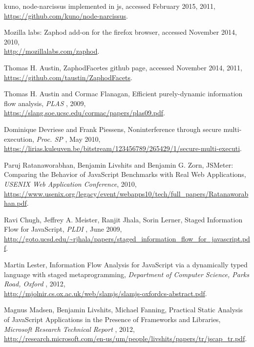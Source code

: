\begin{thebibliography}{10}
 kuno, node-narcissus implemented in js, accessed February 2015, 2011,\\
\url{https://github.com/kuno/node-narcissus}.

 Mozilla labs: Zaphod add-on for the firefox browser, accessed November 2014, 2010, \\
\url{http://mozillalabs.com/zaphod}.

 Thomas H. Austin, ZaphodFacetes github page, accessed November 2014, 2011, \\
\url{https://github.com/taustin/ZaphodFacets}.

 Thomas H. Austin and Cormac Flanagan, Efficient purely-dynamic information
flow analysis, {\it PLAS }, 2009, \\
\url{https://slang.soe.ucsc.edu/cormac/papers/plas09.pdf}.

 Dominique Devriese and Frank Piessens, Noninterference through secure multi-execution, {\it Proc. SP} , May 2010, \\
\url{https://lirias.kuleuven.be/bitstream/123456789/265429/1/secure-multi-executi}.

 Paruj Ratanaworabhan, Benjamin Livshits and Benjamin G. Zorn, JSMeter: Comparing the Behavior of JavaScript Benchmarks with Real Web Applications, {\it USENIX Web Application Conference}, 2010, \\
\url{https://www.usenix.org/legacy/event/webapps10/tech/full_papers/Ratanaworabhan.pdf}.

 Ravi Chugh, Jeffrey A. Meister, Ranjit Jhala, Sorin Lerner, Staged Information Flow for JavaScript, {\it PLDI }, June 2009, \\
\url{http://goto.ucsd.edu/~rjhala/papers/staged_information_flow_for_javascript.pdf}.

 Martin Lester, Information Flow Analysis for JavaScript via a dynamically typed language with staged metaprogramming, { \it Department of Computer Science, Parks Road, Oxford }, 2012,\\
\url{http://mjolnir.cs.ox.ac.uk/web/slamjs/slamjs-oxfordcs-abstract.pdf}.

 Magnus Madsen, Benjamin Livshits, Michael Fanning, Practical Static Analysis of JavaScript Applications in the Presence of Frameworks and Libraries, { \it Microsoft Research Technical Report }, 2012,\\
\url{http://research.microsoft.com/en-us/um/people/livshits/papers/tr/jscap_tr.pdf}.


\end{thebibliography}
